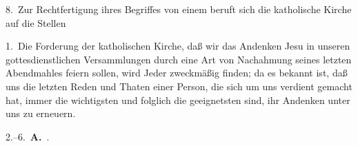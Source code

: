 8.~Zur Rechtfertigung ihres Begriffes von einem  beruft sich die katholische Kirche auf die Stellen \  \ \ \uam

1.~Die Forderung der katholischen Kirche, daß wir das Andenken Jesu in unseren gottesdienstlichen Versammlungen durch eine Art von Nachahmung seines letzten Abendmahles feiern sollen, wird Jeder zweckmäßig finden; da es bekannt ist, daß uns die letzten Reden und Thaten einer Person, die sich um uns verdient gemacht hat, immer die wichtigsten und folglich die geeignetsten sind, ihr Andenken unter uns zu erneuern.\par
2.--6.\ \textbf{A.}~.\par
